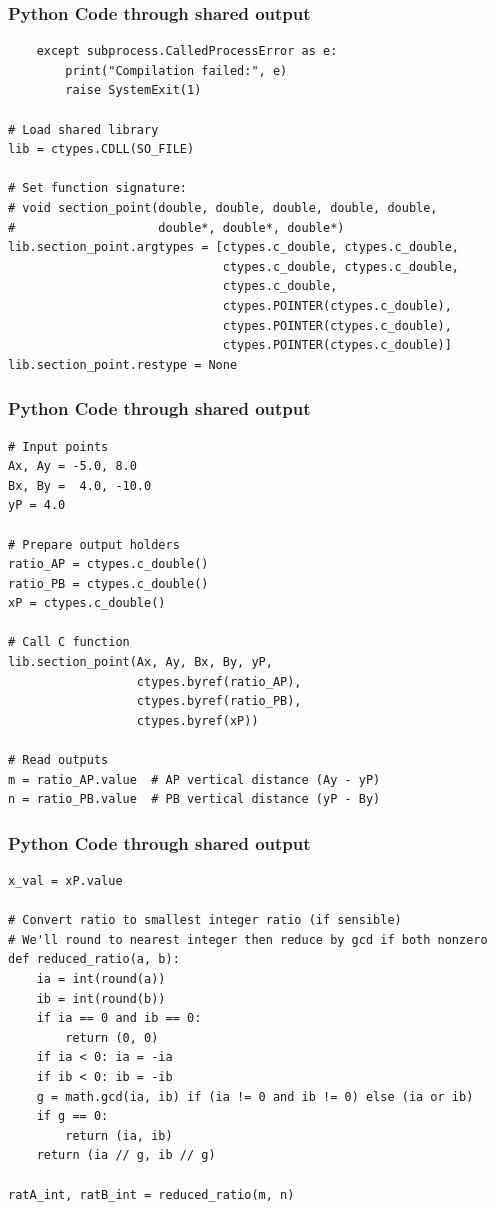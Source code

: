 \documentclass{beamer}
\begin{document}
\begin{frame}[fragile]
	\frametitle{Python Code through shared output}
	\begin{lstlisting}
    except subprocess.CalledProcessError as e:
        print("Compilation failed:", e)
        raise SystemExit(1)

# Load shared library
lib = ctypes.CDLL(SO_FILE)

# Set function signature:
# void section_point(double, double, double, double, double,
#                    double*, double*, double*)
lib.section_point.argtypes = [ctypes.c_double, ctypes.c_double,
                              ctypes.c_double, ctypes.c_double,
                              ctypes.c_double,
                              ctypes.POINTER(ctypes.c_double),
                              ctypes.POINTER(ctypes.c_double),
                              ctypes.POINTER(ctypes.c_double)]
lib.section_point.restype = None
\end{lstlisting}
\end{frame}
\begin{frame}[fragile]
	\frametitle{Python Code through shared output}
	\begin{lstlisting}
# Input points
Ax, Ay = -5.0, 8.0
Bx, By =  4.0, -10.0
yP = 4.0

# Prepare output holders
ratio_AP = ctypes.c_double()
ratio_PB = ctypes.c_double()
xP = ctypes.c_double()

# Call C function
lib.section_point(Ax, Ay, Bx, By, yP,
                  ctypes.byref(ratio_AP),
                  ctypes.byref(ratio_PB),
                  ctypes.byref(xP))

# Read outputs
m = ratio_AP.value  # AP vertical distance (Ay - yP)
n = ratio_PB.value  # PB vertical distance (yP - By)
\end{lstlisting}
\end{frame}
\begin{frame}[fragile]
	\frametitle{Python Code through shared output}
	\begin{lstlisting}
x_val = xP.value

# Convert ratio to smallest integer ratio (if sensible)
# We'll round to nearest integer then reduce by gcd if both nonzero
def reduced_ratio(a, b):
    ia = int(round(a))
    ib = int(round(b))
    if ia == 0 and ib == 0:
        return (0, 0)
    if ia < 0: ia = -ia
    if ib < 0: ib = -ib
    g = math.gcd(ia, ib) if (ia != 0 and ib != 0) else (ia or ib)
    if g == 0:
        return (ia, ib)
    return (ia // g, ib // g)

ratA_int, ratB_int = reduced_ratio(m, n)
\end{lstlisting}
\end{frame}
\end{document}
